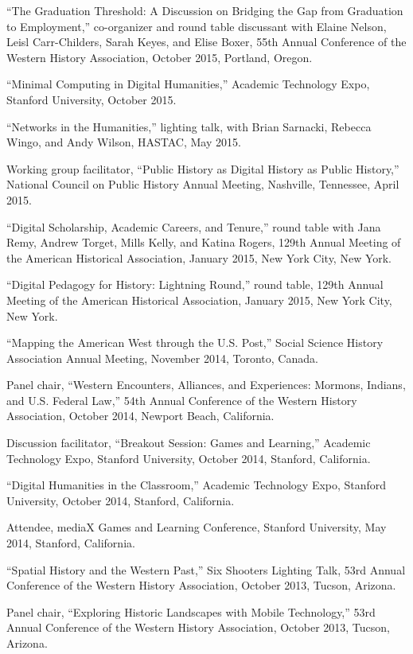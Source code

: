 ``The Graduation Threshold: A Discussion on Bridging the Gap from
Graduation to Employment,'' co-organizer and round table discussant with
Elaine Nelson, Leisl Carr-Childers, Sarah Keyes, and Elise Boxer, 55th
Annual Conference of the Western History Association, October 2015,
Portland, Oregon.

``Minimal Computing in Digital Humanities,'' Academic Technology Expo,
Stanford University, October 2015.

``Networks in the Humanities,'' lighting talk, with Brian Sarnacki,
Rebecca Wingo, and Andy Wilson, HASTAC, May 2015.

Working group facilitator, ``Public History as Digital History as Public
History,'' National Council on Public History Annual Meeting, Nashville,
Tennessee, April 2015.

``Digital Scholarship, Academic Careers, and Tenure,'' round table with
Jana Remy, Andrew Torget, Mills Kelly, and Katina Rogers, 129th Annual
Meeting of the American Historical Association, January 2015, New York
City, New York.

``Digital Pedagogy for History: Lightning Round,'' round table, 129th
Annual Meeting of the American Historical Association, January 2015, New
York City, New York.

``Mapping the American West through the U.S. Post,'' Social Science
History Association Annual Meeting, November 2014, Toronto, Canada.

Panel chair, ``Western Encounters, Alliances, and Experiences: Mormons,
Indians, and U.S. Federal Law,'' 54th Annual Conference of the Western
History Association, October 2014, Newport Beach, California.

Discussion facilitator, ``Breakout Session: Games and Learning,''
Academic Technology Expo, Stanford University, October 2014, Stanford,
California.

``Digital Humanities in the Classroom,'' Academic Technology Expo,
Stanford University, October 2014, Stanford, California.

Attendee, mediaX Games and Learning Conference, Stanford University, May
2014, Stanford, California.

``Spatial History and the Western Past,'' Six Shooters Lighting Talk,
53rd Annual Conference of the Western History Association, October 2013,
Tucson, Arizona.

Panel chair, ``Exploring Historic Landscapes with Mobile Technology,''
53rd Annual Conference of the Western History Association, October 2013,
Tucson, Arizona.

